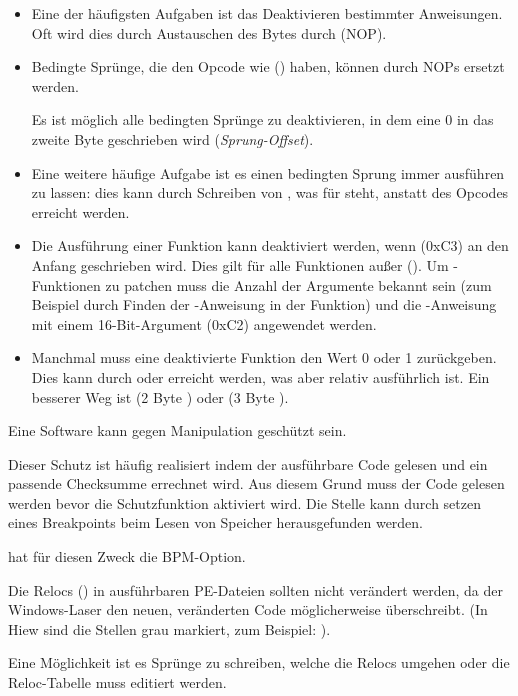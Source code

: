 \begin{itemize}

\item 
Eine der häufigsten Aufgaben ist das Deaktivieren bestimmter Anweisungen. Oft
wird dies durch Austauschen des Bytes durch  (\ac{NOP}).

\item
Bedingte Sprünge, die den Opcode wie  (\JZ) haben, können durch
\ac{NOP}s ersetzt werden.

Es ist möglich alle bedingten Sprünge zu deaktivieren, in dem eine 0 in das
zweite Byte geschrieben wird (\emph{Sprung-Offset}).

\item 
Eine weitere häufige Aufgabe ist es einen bedingten Sprung immer ausführen zu
lassen: dies kann durch Schreiben von , was für \JMP steht, anstatt des
Opcodes erreicht werden.

\item Die Ausführung einer Funktion kann deaktiviert werden, wenn \RETN (0xC3) an
den Anfang geschrieben wird. Dies gilt für alle Funktionen außer 
().
Um -Funktionen zu patchen muss die Anzahl der Argumente bekannt sein
(zum Beispiel durch Finden der \RETN-Anweisung in der Funktion) und die \RETN-Anweisung
mit einem 16-Bit-Argument (0xC2) angewendet werden.

\item Manchmal muss eine deaktivierte Funktion den Wert 0 oder 1 zurückgeben.
Dies kann durch  oder  erreicht werden, was aber relativ
ausführlich ist.
Ein besserer Weg ist  (2 Byte ) oder 
(3 Byte ).

\end{itemize}

Eine Software kann gegen Manipulation geschützt sein.

Dieser Schutz ist häufig realisiert indem der ausführbare Code gelesen und ein
passende Checksumme errechnet wird.
Aus diesem Grund muss der Code gelesen werden bevor die Schutzfunktion aktiviert
wird. Die Stelle kann durch setzen eines Breakpoints beim Lesen von Speicher
herausgefunden werden.

\tracer hat für diesen Zweck die BPM-Option.

Die Relocs () in ausführbaren PE-Dateien sollten nicht
verändert werden, da der Windows-Laser den neuen, veränderten Code möglicherweise
überschreibt.
(In Hiew sind die Stellen grau markiert, zum Beispiel: ).

Eine Möglichkeit ist es Sprünge zu schreiben, welche die Relocs umgehen oder die
Reloc-Tabelle muss editiert werden.
